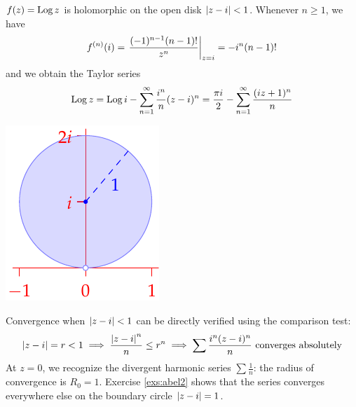 \begin{example}{}{}
  \begin{minipage}[t]{0.7\linewidth}\vspace{0pt}
		$f(z)=\operatorname{Log} z$ is holomorphic on the open disk $\left| z-i\right|<1$.\smallbreak
		Whenever $n\ge 1$, we have
		\[f^{(n)}(i)=\left.\frac{(-1)^{n-1}(n-1)!}{z^{n}}\right|_{z=i}=-i^n(n-1)!\]
		and we obtain the Taylor series
  	\[\operatorname{Log} z=\operatorname{Log} i-\sum_{n=1}^\infty \frac{i^n}{n}(z-i)^n =\frac{\pi i}2-\sum_{n=1}^\infty \frac{(iz+1)^n}n\]
  \end{minipage}\begin{minipage}[t]{0.3\linewidth}\vspace{0pt}
  \flushright\includegraphics{taylorex2}
  \end{minipage}\medbreak
  
	Convergence when $\left| z-i\right|<1$ can be directly verified using the comparison test:
	\[\left| z-i\right|=r<1\implies\frac{\left| z-i\right|^n}n\le r^n\implies \sum\frac{i^n(z-i)^n}n\text{ converges absolutely}\]
	At $z=0$, we recognize the divergent harmonic series $\sum \frac 1n$: the radius of convergence is $R_0=1$. Exercise \ref{exs:abel2} shows that the series converges everywhere else on the boundary circle $\left| z-i\right|=1$.
\end{example}


